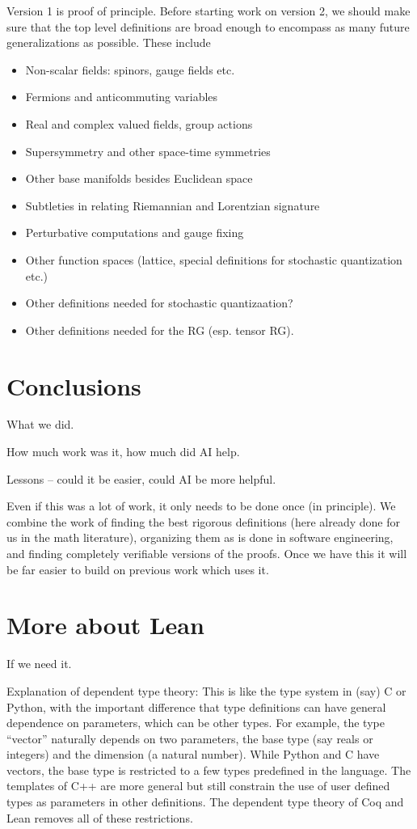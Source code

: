 \documentclass{article}
\newcommand{\1}{\mathbbm{1}}
\theoremstyle{plain}
\theoremstyle{definition}
\numberwithin{equation}{section}
\begin{document}
Version 1 is proof of principle.  Before starting work on version 2, we should make sure that the top level definitions are broad enough to encompass as many future generalizations as possible.
These include
\begin{itemize}
    \item Non-scalar fields: spinors, gauge fields etc.
    \item Fermions and anticommuting variables
    \item Real and complex valued fields, group actions
    \item Supersymmetry and other space-time symmetries
    \item Other base manifolds besides Euclidean space
    \item Subtleties in relating Riemannian and Lorentzian signature
    \item Perturbative computations and gauge fixing
    \item Other function spaces (lattice, special definitions for stochastic quantization etc.)
    \item Other definitions needed for stochastic quantizaation?
    \item Other definitions needed for the RG (esp. tensor RG).
\end{itemize}

\section{Conclusions}

What we did.

How much work was it, how much did AI help.

Lessons -- could it be easier, could AI be more helpful.

Even if this was a lot of work, it only needs to be done once (in principle).  We combine the work of finding the best
rigorous definitions (here already done for us in the math literature), organizing them as is done in software engineering,
and finding completely verifiable versions of the proofs.  Once we have this it will be far easier to build on previous work
which uses it.


\appendix

\section{More about Lean}

If we need it.

Explanation of dependent type theory:
This is like the type system in (say) C or Python, with the important difference that type definitions can have
general dependence on parameters, which can be other types.  
For example, the type ``vector'' naturally depends on two parameters, the base
type (say reals or integers) and the dimension (a natural number).  While Python and C have vectors, the base type
is restricted to a few types predefined in the language.  The templates of C++ are more general but still constrain
the use of user defined types as parameters in other definitions.  The dependent type theory of Coq and Lean
removes all of these restrictions.
\end{document}
